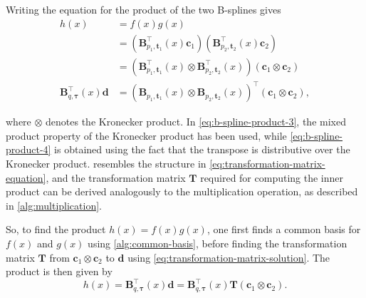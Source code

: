 Writing the equation for the product of the two B-splines gives
\begin{subequations}\label{eq:b-spline-product}
    \begin{align}
        h(x) &= f(x) g(x) \label{eq:b-spline-product-1} \\
        &= \left(\mathbf{B}_{p_1, \mathbf{t}_1}^{\top}(x) \mathbf{c}_1\right) 
        \left(\mathbf{B}_{p_2, \mathbf{t}_2}^{\top}(x) \mathbf{c}_2\right) \label{eq:b-spline-product-2} \\
        &= \left(\mathbf{B}_{p_1, \mathbf{t}_1}^{\top}(x) \otimes \mathbf{B}_{p_2, \mathbf{t}_2}^{\top}(x)\right) 
        \left(\mathbf{c}_1 \otimes \mathbf{c}_2\right) \label{eq:b-spline-product-3} \\
        \mathbf{B}_{q, \boldsymbol{\tau}}^{\top}(x) \mathbf{d} 
        &= \left(\mathbf{B}_{p_1, \mathbf{t}_1}(x) \otimes \mathbf{B}_{p_2, \mathbf{t}_2}(x)\right)^{\top} \left(\mathbf{c}_1 \otimes \mathbf{c}_2\right), \label{eq:b-spline-product-4}
    \end{align}
\end{subequations}

where $\otimes$ denotes the Kronecker product. In \cref{eq:b-spline-product-3}, the mixed product property of the Kronecker product has been used, while \cref{eq:b-spline-product-4} is obtained using the fact that the transpose is distributive over the Kronecker product.  resembles the structure in \cref{eq:transformation-matrix-equation}, and the transformation matrix $\mathbf T$ required for computing the inner product can be derived analogously to the multiplication operation, as described in \cref{alg:multiplication}.

So, to find the product $h(x) = f(x) g(x)$, one first finds a common basis for $f(x)$ and $g(x)$ using \cref{alg:common-basis}, before finding the transformation matrix $\mathbf T$ from $\mathbf c_1 \otimes \mathbf c_2$ to $\mathbf d$ using \cref{eq:transformation-matrix-solution}. The product is then given by
\begin{equation}
    h(x) = \mathbf B_{q, \boldsymbol{\tau}}^\top(x) \mathbf d = \mathbf B_{q, \boldsymbol{\tau}}^\top(x) \mathbf T (\mathbf c_1 \otimes \mathbf c_2).
\end{equation}

